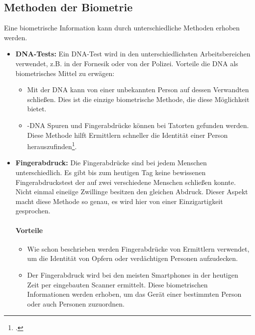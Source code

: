\subsection{Methoden der Biometrie}
Eine biometrische Information kann durch unterschiedliche Methoden erhoben werden.
\begin{itemize}
	\item \textbf{DNA-Tests:} Ein DNA-Test wird in den unterschiedlichsten Arbeitsbereichen verwendet, z.B. in der Fornesik oder von der Polizei.
	Vorteile die DNA als biometrisches Mittel zu erwägen:
	\begin{itemize}
		\item Mit der DNA kann von einer unbekannten Person auf dessen Verwandten schließen. Dies ist die einzige biometrische Methode, die diese Möglichkeit bietet.
		\item-DNA Spuren und Fingerabdrücke können bei Tatorten gefunden werden. Diese Methode hilft Ermittlern schneller die Identität einer Person herauszufinden\footcite{dna-test}.
	\end{itemize}
	\item \textbf{Fingerabdruck:} Die Fingerabdrücke sind bei jedem Menschen unterschiedlich. 
	Es gibt bis zum heutigen Tag keine bewissenen Fingerabdruckstest der auf zwei verschiedene Menschen schließen konnte. 
	Nicht einmal eineiige Zwillinge besitzen den gleichen Abdruck.
	Dieser Aspekt macht diese Methode so genau, es wird hier von einer Einzigartigkeit gesprochen.
	\paragraph{Vorteile}
	\begin{itemize}
		\item Wie schon beschrieben werden Fingerabdrücke von Ermittlern verwendet, um die Identität von Opfern oder verdächtigen Personen aufzudecken.
		\item Der Fingerabdruck wird bei den meisten Smartphones in der heutigen Zeit per eingebauten Scanner ermittelt. Diese biometrischen Informationen werden erhoben, um das Gerät einer bestimmten Person oder auch Personen zuzuordnen.
	\end{itemize}

\end{itemize}
